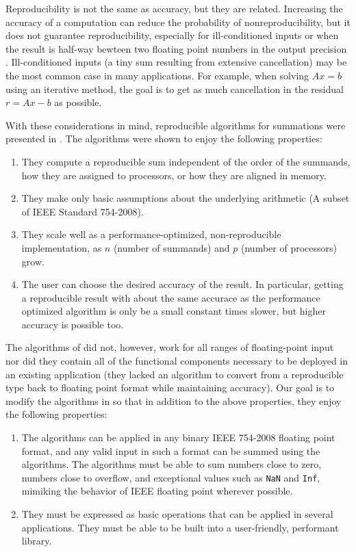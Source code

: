   Reproducibility is not the same as accuracy, but they are related. Increasing the accuracy of a computation can reduce the probability of nonreproducibility, but it does not guarantee reproducibility, especially for ill-conditioned inputs or when the result is half-way bewteen two floating point numbers in the output precision \cite{taufer}. Ill-conditioned inputs (a tiny sum resulting from extensive cancellation) may be the most common case in many applications. For example, when solving $Ax = b$ using an iterative method, the goal is to get as much cancellation in the residual $r = Ax - b$ as possible.

  With these considerations in mind, reproducible algorithms for summations were presented in \cite{repsum}. The algorithms were shown to enjoy the following properties:
  \begin{enumerate}
    \item They compute a reproducible sum independent of the order of the summands, how they are assigned to processors, or how they are aligned in memory.
    \item They make only basic assumptions about the underlying arithmetic (A subset of IEEE Standard 754-2008).
    \item They scale well as a performance-optimized, non-reproducible implementation, as $n$ (number of summands) and $p$ (number of processors) grow.
    \item The user can choose the desired accuracy of the result. In particular, getting a reproducible result with about the same accurace as the performance optimized algorithm is only be a small constant times slower, but higher accuracy is possible too.
  \end{enumerate}
  The algorithms of \cite{repsum} did not, however, work for all ranges of floating-point input nor did they contain all of the functional components necessary to be deployed in an existing application (they lacked an algorithm to convert from a reproducible type back to floating point format while maintaining accuracy). Our goal is to modify the algorithms in \cite{repsum} so that in addition to the above properties, they enjoy the following properties:
  \begin{enumerate}
    \item The algorithms can be applied in any binary IEEE 754-2008 floating point format, and any valid input in such a format can be summed using the algorithms. The algorithms must be able to sum numbers close to zero, numbers close to overflow, and exceptional values such as \texttt{NaN} and \texttt{Inf}, mimiking the behavior of IEEE floating point wherever possible.
    \item They must be expressed as basic operations that can be applied in several applications. They must be able to be built into a user-friendly, performant library.
  \end{enumerate}


